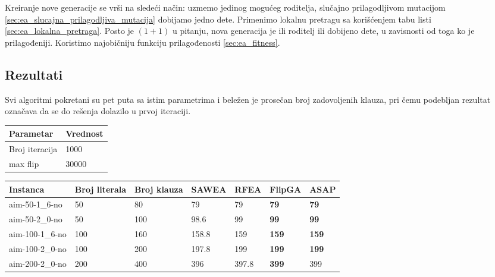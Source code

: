 \documentclass{article}
\begin{document}
Kreiranje nove generacije se vrši na sledeći način: uzmemo jedinog mogućeg roditelja, slučajno prilagodljivom mutacijom \ref{sec:ea_slucajna_prilagodljiva_mutacija} dobijamo jedno dete. Primenimo lokalnu pretragu sa korišćenjem tabu listi \ref{sec:ea_lokalna_pretraga}. Posto je $(1+1)$ u pitanju, nova generacija je ili roditelj ili dobijeno dete, u zavisnosti od toga ko je prilagođeniji. Koristimo najobičniju funkciju prilagođenosti \ref{sec:ea_fitness}.

\subsection{Rezultati}
\label{sec:ea_rezultati}
Svi algoritmi pokretani su pet puta sa istim parametrima i beležen je prosečan broj zadovoljenih klauza, pri čemu podebljan rezultat označava da se do rešenja dolazilo u prvoj iteraciji. \\

\begin{table}[h!]
\centering
{}\label{tab:ea_parametri} 
\begin{tabular}{ |p{3cm}|p{2cm}| }
 \hline
 Parametar 	& Vrednost \\ \hline
 Broj iteracija & 1000 \\ \hline
 max flip & 30000 \\  \hline
\end{tabular}
\end{table}


\begin{table}[h!]
\centering
{}\label{tab:ea_UNSAT}
\begin{tabular}{ |p{3cm}|p{1.6cm}|p{1.6cm}||p{1.6cm}|p{1.6cm}|p{1.6cm}|p{1.6cm}|} \hline
 Instanca & Broj \break literala & Broj \break klauza & SAWEA & RFEA & FlipGA & ASAP \\ \hline
 aim-50-1\_6-no & 50 & 80 & 79 & 79 & \textbf{79} & \textbf{79} \\ \hline
 aim-50-2\_0-no & 50 & 100 & 98.6 &  99 & \textbf{99} & \textbf{99} \\ \hline
 aim-100-1\_6-no & 100 & 160 & 158.8 & 159 & \textbf{159} & \textbf{159} \\ \hline
 aim-100-2\_0-no & 100 & 200 & 197.8 & 199 & \textbf{199} & \textbf{199} \\ \hline
 aim-200-2\_0-no & 200 & 400 & 396 & 397.8 & \textbf{399} & 399 \\ \hline
\end{tabular}
\end{table}
\end{document}
